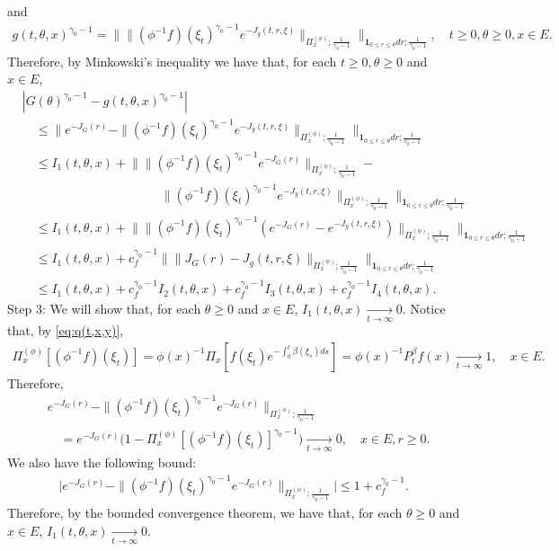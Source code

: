 	and
\begin{align}
	g(t,\theta,x)^{\gamma_0 - 1}
	=\Big\| \| (\phi^{-1}f)(\xi_t) ^{\gamma_0 - 1} e^{-J_g(t,r,\xi)} \|_{\Pi_x^{(\phi)};\frac{1}{\gamma_0 - 1}} \Big\|_{\mathbf 1_{0\leq r\leq \theta} dr;\frac{1}{\gamma_0 - 1}},
	\quad t\geq 0, \theta \geq 0, x\in E.
\end{align}	
	Therefore, by Minkowski's inequality we have that, for each $t\geq 0, \theta \geq 0$ and $x\in E$,
\begin{align}
	&|  G(\theta)^{\gamma_0 - 1} - g(t,\theta,x)^{\gamma_0 - 1} |
	\\&\quad \leq \Big\| e^{ - J_G(r)} - \| (\phi^{-1}f)(\xi_t)^{\gamma_0 - 1} e^{-J_g(t, r,\xi)} \|_{\Pi_x^{(\phi)};\frac{1}{\gamma_0 - 1}} \Big\|_{\mathbf 1_{0\leq r\leq \theta} dr;\frac{1}{\gamma_0 - 1}}
	\\&\quad \leq I_1(t,\theta,x) + \Big\| \| (\phi^{-1}f)(\xi_t)^{\gamma_0 - 1} e^{-J_G(r)} \|_{\Pi_x^{(\phi)};\frac{1}{\gamma_0 - 1}} -
	\\&\quad \qquad \qquad \qquad \qquad \qquad \| (\phi^{-1}f)(\xi_t)^{\gamma_0 - 1} e^{-J_g(t,r,\xi)} \|_{\Pi_x^{(\phi)};\frac{1}{\gamma_0 - 1}} \Big\|_{\mathbf 1_{0\leq r\leq \theta} dr;\frac{1}{\gamma_0 - 1}}
	\\&\quad \leq I_1(t,\theta,x) + \Big\| \|  (\phi^{-1}f)(\xi_t)^{\gamma_0 - 1} ( e^{-J_G(r)} - e^{-J_g(t,r,\xi)} )  \|_{\Pi_x^{(\phi)};\frac{1}{\gamma_0 - 1}} \Big\|_{\mathbf 1_{0\leq r\leq \theta} dr;\frac{1}{\gamma_0 - 1}}
	\\&\quad \leq I_1(t,\theta,x) + c_f^{\gamma_0 - 1}\Big\| \|  J_G(r) -J_g(t,r,\xi)  \|_{\Pi_x^{(\phi)};\frac{1}{\gamma_0 - 1}} \Big\|_{\mathbf 1_{0\leq r\leq \theta} dr;\frac{1}{\gamma_0 - 1}}
	\\&\quad \leq I_1(t,\theta,x) + c_f^{\gamma_0 - 1} I_2(t,\theta,x) +c_f^{\gamma_0 - 1} I_3(t,\theta,x)+c_f^{\gamma_0 - 1} I_4(t,\theta,x).
\end{align}	
	Step 3: We will show that, for each $\theta \geq 0$ and $x\in E$, $I_1(t,\theta,x) \xrightarrow[t\to \infty]{} 0$.
	Notice that,
	by \eqref{eq:q(t,x,y)},
\begin{align}
	\Pi_x^{(\phi)} [(\phi^{-1}f)(\xi_t)]
	= \phi(x)^{-1}\Pi_x[f(\xi_t) e^{- \int_0^t \beta(\xi_s) ds}]
	= \phi(x)^{-1} P^\beta_t f(x)
	\xrightarrow[t\to \infty]{} 1,
	\quad x\in E.
\end{align}
	Therefore,
\begin{align}
	&e^{ - J_G(r)} - \| (\phi^{-1}f)(\xi_t)^{\gamma_0 - 1} e^{-J_G(r)} \|_{\Pi_x^{(\phi)};\frac{1}{\gamma_0 - 1}}
	\\&\quad =e^{ - J_G(r)} \Big( 1   -  \Pi_x^{(\phi)}[ (\phi^{-1}f)(\xi_t) ]^{\gamma_0 - 1}   \Big)
	\xrightarrow[t\to \infty]{} 0,
	\quad x\in E, r\geq 0.
\end{align}
	We also have the following bound:
\begin{align}
	\Big| e^{ - J_G(r)} - \| (\phi^{-1}f)(\xi_t)^{\gamma_0 - 1} e^{-J_G(r)} \|_{\Pi_x^{(\phi)};\frac{1}{\gamma_0 - 1}} \Big|
	\leq 1+ c_f^{\gamma_0 - 1}.
\end{align}
	Therefore, by the bounded convergence theorem, we have that, for each $\theta \geq 0$ and $x\in E$, $I_1(t,\theta, x) \xrightarrow[t\to \infty]{} 0$.
	
